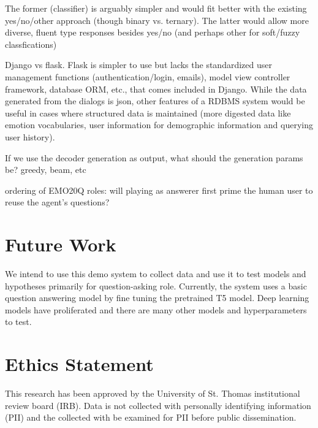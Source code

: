 \documentclass[conference]{IEEEtran}
\begin{document}
The former (classifier) is arguably simpler and would fit better with
the existing yes/no/other approach (though binary vs. ternary). The
latter would allow more diverse, fluent type responses besides yes/no
(and perhaps other for soft/fuzzy classfications)

Django vs flask. Flask is simpler to use but lacks the standardized
user management functions (authentication/login, emails), model view
controller framework, database ORM, etc., that comes included in
Django.  While the data generated from the dialogs is json, other
features of a RDBMS system would be useful in cases where structured
data is maintained (more digested data like emotion vocabularies, user
information for demographic information and querying user history).

If we use the decoder generation as output, what should the generation
params be?  greedy, beam, etc

ordering of EMO20Q roles: will playing as answerer first prime the
human user to reuse the agent's questions?

\section{Future Work}

We intend to use this demo system to collect data and use it to test
models and hypotheses primarily for question-asking role.  Currently,
the system uses a basic question answering model by fine tuning the
pretrained T5 model.  Deep learning models have proliferated and there
are many other models and hyperparameters to test.



\section{Ethics Statement}

This research has been approved by the University of St. Thomas
institutional review board (IRB).  Data is not collected with
personally identifying information (PII) and the collected with be
examined for PII before public dissemination.





\end{document}
